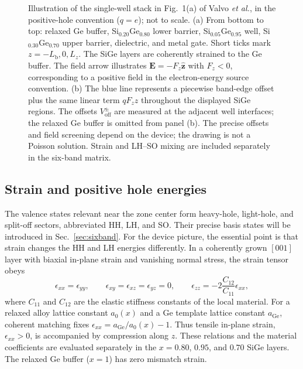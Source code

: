 \documentclass[10pt,letterpaper]{article}
\newcommand{\ep}{\epsilon}
\begin{document}
\begin{figure}[!htbp]
{%
}
\endgroup
\caption{Illustration of the single-well stack in Fig.~1(a) of
Valvo \emph{et al.}, in the positive-hole convention ($q=e$); not to scale.
(a) From bottom to top: relaxed Ge buffer, Si$_{0.20}$Ge$_{0.80}$ lower
barrier, Si$_{0.05}$Ge$_{0.95}$ well, Si$_{0.30}$Ge$_{0.70}$ upper barrier,
dielectric, and metal gate. Short ticks mark $z=-L_{\mathrm b},0,L_z$.
The SiGe layers are coherently strained to the Ge buffer. The field arrow
illustrates $\mathbf E=-F_z\hat{\mathbf z}$ with $F_z<0$, corresponding to
a positive field in the electron-energy source convention.
(b) The blue line represents a piecewise band-edge offset plus the same
linear term $qF_z z$ throughout the displayed SiGe regions. The offsets
$V_{\mathrm{off}}^{\pm}$ are measured at the adjacent well interfaces; the
relaxed Ge buffer is omitted from panel (b). The precise offsets and field
screening depend on the device; the drawing is not a Poisson solution.
Strain and LH--SO mixing are included separately in the six-band matrix.}
\label{fig:device-schematic}
\end{figure}


\subsection{Strain and positive hole energies}

The valence states relevant near the zone center form heavy-hole, light-hole, and split-off sectors, abbreviated HH, LH, and SO. Their precise basis states will be introduced in Sec.~\ref{sec:sixband}. For the device picture, the essential point is that strain changes the HH and LH energies differently. In a coherently grown $[001]$ layer with biaxial in-plane strain and vanishing normal stress, the strain tensor obeys
\begin{equation}
\ep_ {xx}=\ep_ {yy},\qquad
\ep_ {xy}=\ep_ {xz}=\ep_ {yz}=0,\qquad
\ep_ {zz}=-2\frac{C_{12}}{C_{11}}\ep_ {xx},
\label{eq:biaxial}
\end{equation}
where $C_{11}$ and $C_{12}$ are the elastic stiffness constants of the local material. For a relaxed alloy lattice constant $a_0(x)$ and a Ge template lattice constant $a_{\mathrm{Ge}}$, coherent matching fixes $\ep_ {xx}=a_{\mathrm{Ge}}/a_0(x)-1$. Thus tensile in-plane strain, $\ep_ {xx}>0$, is accompanied by compression along $z$. These relations and the material coefficients are evaluated separately in the $x=0.80$, $0.95$, and $0.70$ SiGe layers. The relaxed Ge buffer ($x=1$) has zero mismatch strain.
\end{document}
